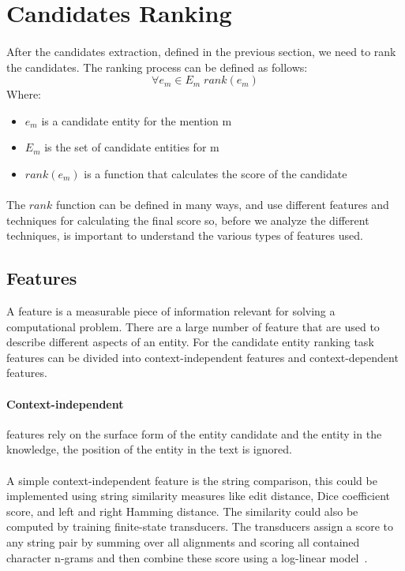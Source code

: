 \section{Candidates Ranking}
\paragraph{}
After the candidates extraction, defined in the previous section, we need to rank the candidates. The ranking process can be defined as follows:
\begin{equation}
\forall e_m \in E_m \; rank(e_m)
\end{equation}
Where:

\begin{itemize}[noitemsep,  topsep=10pt]
\item $e_m$ is a candidate entity for the mention m
\item $E_m$ is the set of candidate entities for m
\item $rank(e_m)$ is a function that calculates the score of the candidate
\end{itemize}

\paragraph{}
The $rank$ function can be defined in many ways, and use different features and techniques for calculating the final score so, before we analyze the different techniques, is important to understand the various types of features used.
\pagebreak
\subsection{Features}
A feature is a measurable piece of information relevant for solving a computational problem. There are a large number of feature that are used to describe different aspects of an entity. For the candidate entity ranking task features can be divided into context-independent features and context-dependent features.

\paragraph{Context-independent} features rely on the surface form of the entity candidate and the entity in the knowledge, the position of the entity in the text is ignored. 

\paragraph{} A simple context-independent feature is the string comparison, this could be implemented using string similarity measures like edit distance, Dice coefficient score, and left and right Hamming distance. The similarity could also be computed by training finite-state transducers. The transducers assign a score to any string pair by summing over all alignments and scoring all contained character n-grams and then combine these score using a log-linear model~\cite{dredze2010entity}.

